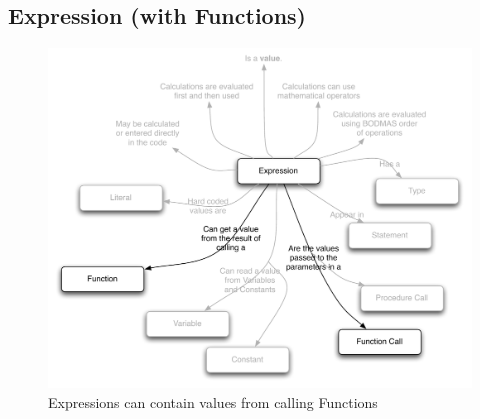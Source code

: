 \clearpage
\subsection{Expression (with Functions)} %
\label{sub:expression_with_functions_}

\begin{figure}[h]
\includegraphics[width=\textwidth]{topics/function-decl/diagrams/Expression} 
 \caption{Expressions can contain values from calling Functions}
 \label{fig:function-decl-expression}
\end{figure}


